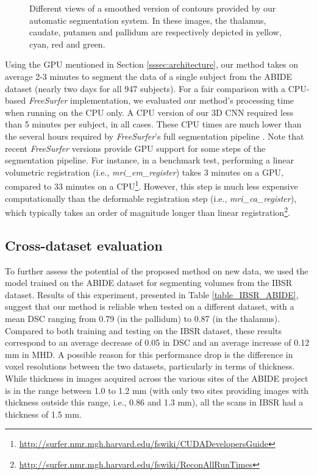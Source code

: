 \documentclass[twoside,fleqn,espcrc2]{elsarticle}
\newcommand{\FreeSurfer}{\textit{FreeSurfer}}
\begin{document}
\begin{figure}[ht!]
     \begin{center}
    
        \caption{Different views of a smoothed version of contours provided by our automatic segmentation system. In these images, the thalamus, caudate, putamen and pallidum are respectively depicted in yellow, cyan, red and green.}
        \label{fig:3D}
\end{center}        
\end{figure}


Using the GPU mentioned in Section \ref{sssec:architecture}, our method takes on average 2-3 minutes to segment the data of a single subject from the ABIDE dataset (nearly two days for all 947 subjects). For a fair comparison with a CPU-based \FreeSurfer{} implementation, we evaluated our method's processing time when running on the CPU only. A CPU version of our 3D CNN required less than 5 minutes per subject, in all cases. These CPU times are much lower than the several hours required by
\FreeSurfer{}'s full segmentation pipeline \cite{khan2008freesurfer,huo2016consistent}. Note that recent \FreeSurfer{} versions provide GPU support for some steps of the segmentation pipeline. For instance, in a benchmark test, performing a linear volumetric registration (i.e., \textit{mri\_em\_register}) takes 3 minutes on a GPU, compared to 33 minutes on a CPU\footnote{\url{http://surfer.nmr.mgh.harvard.edu/fswiki/CUDADevelopersGuide}}. However, this step is much less expensive computationally than the deformable registration step (i.e., \textit{mri\_ca\_register}), which typically takes an order of magnitude longer than linear registration\footnote{\url{http://surfer.nmr.mgh.harvard.edu/fswiki/ReconAllRunTimes}}.


\subsection{Cross-dataset evaluation}
\label{ssec:IBSR_ABIDE}

To further assess the potential of the proposed method on new data, we used the model trained on the ABIDE dataset for segmenting volumes from the IBSR dataset. Results of this experiment, presented in Table \ref{table_IBSR_ABIDE}, suggest that our method is reliable when tested on a different dataset, with a mean DSC ranging from 0.79 (in the pallidum) to 0.87 (in the thalamus). Compared to both training and testing on the IBSR dataset, these results correspond to an average decrease of 0.05 in DSC and an average increase of 0.12 mm in MHD. A possible reason for this performance drop is the difference in voxel resolutions between the two datasets, particularly in terms of thickness. While thickness in images acquired across the various sites of the ABIDE project is in the range between 1.0 to 1.2 mm (with only two sites providing images with thickness outside this range, i.e., 0.86 and 1.3 mm), all the scans in IBSR had a thickness of 1.5 mm.
\end{document}
